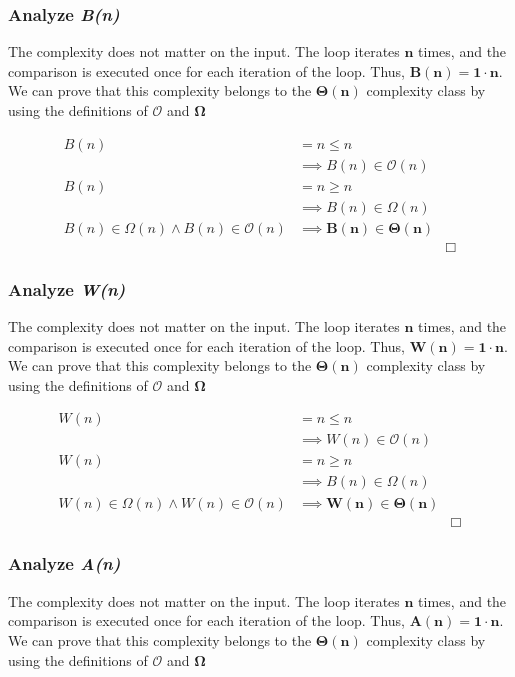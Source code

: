 \documentclass[10pt]{article}
\begin{document}
\subsubsection{Analyze \textit{B(n)}}
\indent \indent The complexity does not matter on the input. The loop iterates $\mathbf{n}$ times, and the comparison is executed once for each iteration of the loop. Thus, $\mathbf{B(n) = 1 \cdot n}$. We can prove that this complexity belongs to the  $\mathbf{\Theta(n)}$ complexity class by using the definitions of $\mathbf{\mathcal{O}}$ and $\mathbf{\Omega}$

\begin{align*}
B(n) &= n \le n &\\
 &\implies B(n) \in \mathcal{O}(n) &\\
B(n) &= n \ge n &\\
 &\implies B(n) \in \Omega(n) &\\
 B(n) \in \Omega(n) \land B(n) \in \mathcal{O}(n) &\implies \mathbf{B(n) \boldsymbol{\in} \Theta(n)} &\\
 & &\Box
\end{align*}

\subsubsection{Analyze \textit{W(n)}}
\indent \indent The complexity does not matter on the input. The loop iterates $\mathbf{n}$ times, and the comparison is executed once for each iteration of the loop. Thus, $\mathbf{W(n) = 1 \cdot n}$. We can prove that this complexity belongs to the  $\mathbf{\Theta(n)}$ complexity class by using the definitions of $\mathbf{\mathcal{O}}$ and $\mathbf{\Omega}$

\begin{align*}
W(n) &= n \le n &\\
 &\implies W(n) \in \mathcal{O}(n) &\\
W(n) &= n \ge n &\\
 &\implies B(n) \in \Omega(n) &\\
 W(n) \in \Omega(n) \land W(n) \in \mathcal{O}(n) &\implies \mathbf{W(n) \boldsymbol{\in} \Theta(n)} &\\
 & &\Box
\end{align*}


\subsubsection{Analyze \textit{A(n)}}
\indent \indent The complexity does not matter on the input. The loop iterates $\mathbf{n}$ times, and the comparison is executed once for each iteration of the loop. Thus, $\mathbf{A(n) = 1 \cdot n}$. We can prove that this complexity belongs to the  $\mathbf{\Theta(n)}$ complexity class by using the definitions of $\mathbf{\mathcal{O}}$ and $\mathbf{\Omega}$
\end{document}
